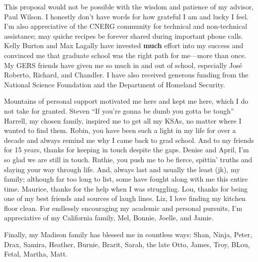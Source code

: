 \footnotesize{
This proposal would not be possible with the wisdom and patience of my advisor,
Paul Wilson. I honestly don't have words for how grateful I am and lucky I
feel.  I'm also appreciative of the CNERG community for technical and
non-technical assistance; may quiche recipes be forever shared during important
phone calls.  Kelly Burton and Max Lagally have invested \textbf{much} effort
into my success and convinced me that graduate school was the right path for
me---more than once.  My GERS friends have given me so much in and out of
school, especially Jos\'e Roberto, Richard, and Chandler.  I have also received
generous funding from the National Science Foundation and the Department of
Homeland Security.

Mountains of personal support motivated me here and kept me here, which I do
not take for granted. Steven ``If you're gonna be dumb you gotta be tough''
Harrell, my chosen family, inspired me to get all my KSAs, no matter where I
wanted to find them. Robin, you have been such a light in my life for over a
decade and always remind me why I came back to grad school.  And to my friends
for 15 years, thanks for keeping in touch despite the gaps.  Denise and April,
I'm so glad we are still in touch. Ruthie, you push me to be fierce, spittin'
truths and slaying your way through life.  And, always last and usually the
least (jk), my family; although far too long to list, some have fought along
with me this entire time.  Maurice, thanks for the help when I was struggling.
Lou, thanks for being one of my best friends and sources of laugh lines. Liz, I
love finding my kitchen floor clean. For endlessly encouraging my academic and
personal pursuits, I'm appreciative of my California family, Mel, Bonnie,
Joelle, and Jamie. 

Finally, my Madison family has blessed me in countless ways: Shan, Ninja,
Peter, Drax, Samira, Heather, Burnie, Brarit, Sarah, the late Otto, James,
Troy, BLou, Fetal, Martha, Matt.
}
